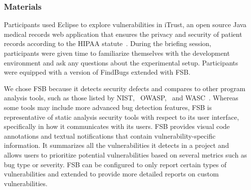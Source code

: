 \documentclass{acm_proc_article-sp}
\begin{document}
\subsubsection{Materials}
Participants used Eclipse to explore vulnerabilities in iTrust, an open source Java medical records web application that ensures the privacy and security of patient records according to the HIPAA statute~\cite{HIPAA}. 
During the briefing session, participants were given time to familiarize themselves with the development environment and ask any questions about the experimental setup.
Participants were equipped with a version of FindBugs extended with FSB.

We chose FSB because it detects security defects and compares to other program analysis tools, such as those listed by NIST,~\cite{SecurityAnalyzers} OWASP,~\cite{OWASPSCA} and WASC~\cite{CodeAnalysis}. 
Whereas some tools may include more advanced bug detection features, FSB is representative of static analysis security tools with respect to its user interface, specifically in how it communicates with its users.
FSB provides visual code annotations and textual notifications that contain vulnerability-specific information.
It summarizes all the vulnerabilities it detects in a project and allows users to prioritize potential vulnerabilities based on several metrics such as bug type or severity.
FSB can be configured to only report certain types of vulnerabilities and extended to provide more detailed reports on custom vulnerabilities.
\end{document}
